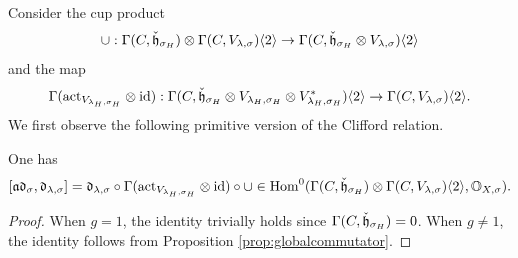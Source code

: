 \documentclass[reqno]{amsart}
\numberwithin{equation}{section}
\numberwithin{equation}{section}
\begin{document}
Consider the cup product \begin{equation}
    \cup: \Gamma(C,\check{\mathfrak{h}}_{\sigma_H})\otimes \Gamma(C,V_{\lambda,\sigma})\langle 2\rangle \to \Gamma(C, \check{\mathfrak{h}}_{\sigma_H}\otimes V_{\lambda,\sigma})\langle 2\rangle\end{equation} and the map \begin{equation}
        \Gamma(\mathrm{act}_{V_{\lambda_H, \sigma_H}}\otimes\mathrm{id}): \Gamma(C,\check{\mathfrak{h}}_{\sigma_H}\otimes V_{\lambda_H,\sigma_H}\otimes V_{\lambda_H,\sigma_H}^*)\langle 2\rangle\to \Gamma(C,V_{\lambda,\sigma})\langle 2\rangle
    .\end{equation}
We first observe the following primitive version of the Clifford relation.
\begin{lemma}\label{lem:cliffordprim}
    One has \[[\mathfrak{a}\mathfrak{d}_{\sigma}, \mathfrak{d}_{\lambda,\sigma}]=\mathfrak{d}_{\lambda,\sigma}\circ \Gamma(\mathrm{act}_{V_{\lambda_H, \sigma_H}}\otimes\mathrm{id})\circ \cup \in \operatorname{Hom}^0(\Gamma(C,\check{\mathfrak{h}}_{\sigma_H})\otimes \Gamma(C,V_{\lambda,\sigma})\langle 2\rangle, \mathbb{O}_{X,\sigma}).\]
\end{lemma}
\begin{proof}
    When $g=1$, the identity trivially holds since $\Gamma(C,\check{\mathfrak{h}}_{\sigma_H})=0$. When $g\neq 1$, the identity follows from Proposition \ref{prop:globalcommutator}.
\end{proof}
\end{document}
